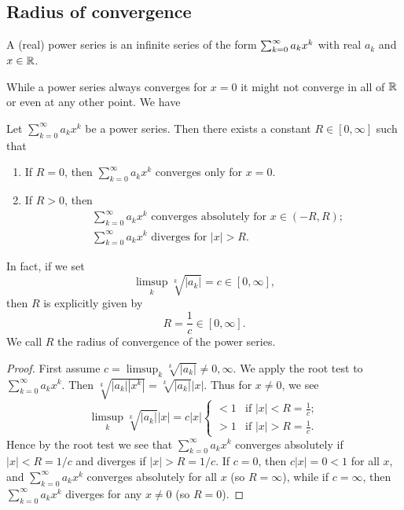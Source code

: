 \documentclass[10pt, a4paper]{article}
\newcommand{\infsumo}[1][k = 0]{\sum_{#1}^{\infty}}
\begin{document}
\subsection{Radius of convergence}

\begin{definition}
    A
    (real)
    power series is an infinite series of the form $\infsum[k = 0]a_kx ^ k$ with real $a_k$ and $x \in \R$.
\end{definition}

While a power series always converges for $x = 0$ it might not converge in all of $\R$ or even at any other point.
We have
\begin{theorem}
    Let $\infsumo a_kx ^ k$ be a power series.
    Then there exists a constant $R \in [0, \infty]$ such that
    \begin{enumerate}[label = (\roman*)]
        \item If $R = 0$,
        then $\infsumo a_kx ^ k$ converges only for $x = 0$.
        \item If $R > 0$,
        then
        \begin{align*}
            &\infsumo a_kx ^ k \text{ converges absolutely for $x \in (-R, R)$}; \\
            &\infsumo a_kx ^ k \text{ diverges for $|x| > R$}.
        \end{align*}
    \end{enumerate}
    In fact,
    if we set
    \[
    \limsup_{k}\sqrt[k]{|a_k|} = c \in [0, \infty],
    \]
    then $R$ is explicitly given by
    \[
    R = \frac{1}{c} \in [0, \infty].
    \]
    We call $R$ the radius of convergence of the power series.
    \begin{proof}
        First assume $c = \limsup_{k}\sqrt[k]{|a_k|} \neq 0, \infty$.
        We apply the root test to $\infsumo a_kx ^ k$.
        Then $\sqrt[k]{|a_k||x ^ k|} = \sqrt[k]{|a_k|}|x|$.
        Thus for $x \neq 0$,
        we see
        \[
        \limsup_{k}\sqrt[k]{|a_k|}|x| = c|x| \begin{cases}
            < 1 & \text{if } |x| < R = \frac{1}{c}; \\
            > 1 & \text{if } |x| > R = \frac{1}{c}.
        \end{cases}
        \]
        Hence by the root test we see that $\infsumo a_kx ^ k$ converges absolutely if $|x| < R = 1 / c$ and diverges if $|x| > R = 1 / c$.
        If $c = 0$,
        then $c|x| = 0 < 1$ for all $x$,
        and $\infsumo a_kx ^ k$ converges absolutely for all $x$
        (so $R = \infty$),
        while if $c = \infty$,
        then $\infsumo a_kx ^ k$ diverges for any $x \neq 0$
        (so $R = 0$).
    \end{proof}
\end{theorem}
\end{document}
